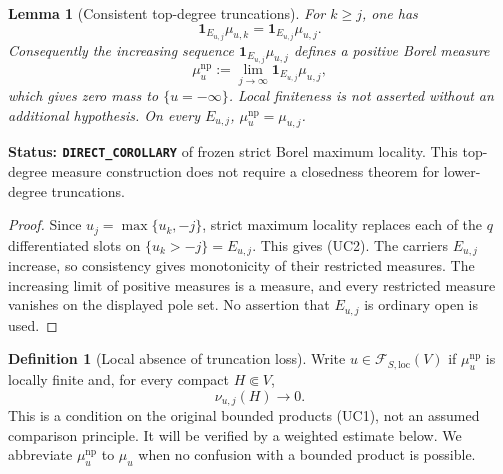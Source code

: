 \documentclass[11pt,a4paper]{article}
\numberwithin{equation}{section}
\newtheorem{lemma}[theorem]{Lemma}
\theoremstyle{definition}
\newtheorem{definition}[theorem]{Definition}
\theoremstyle{remark}
\begin{document}
\begin{lemma}[Consistent top-degree truncations]
\label{lem:r11-consistent-top-truncations}
For $k\geq j$, one has
\[
 \mathbf1_{E_{u,j}}\mu_{u,k}
       =\mathbf1_{E_{u,j}}\mu_{u,j}.
 \tag{UC2}
\]
Consequently the increasing sequence
$\mathbf1_{E_{u,j}}\mu_{u,j}$ defines a positive Borel measure
\[
                \mu_u^{\mathrm{np}}
       :=\lim_{j\to\infty}\mathbf1_{E_{u,j}}\mu_{u,j},
 \tag{UC3}
\]
which gives zero mass to $\{u=-\infty\}$. Local finiteness is
not asserted without an additional hypothesis. On every $E_{u,j}$,
$\mu_u^{\mathrm{np}}=\mu_{u,j}$.
\end{lemma}

\noindent\textbf{Status: \texttt{DIRECT\_COROLLARY}} of frozen
strict Borel maximum locality. This top-degree measure construction
does not require a closedness theorem for lower-degree truncations.

\begin{proof}
Since $u_j=\max\{u_k,-j\}$, strict maximum locality replaces
each of the $q$ differentiated slots on $\{u_k>-j\}=E_{u,j}$.
This gives (UC2). The carriers $E_{u,j}$ increase, so consistency
gives monotonicity of their restricted measures. The increasing
limit of positive measures is a measure, and every restricted
measure vanishes on the displayed pole set. No assertion that
$E_{u,j}$ is ordinary open is used.
\end{proof}

\begin{definition}[Local absence of truncation loss]
\label{def:r11-no-truncation-loss}
Write $u\in\mathcal F_{S,\mathrm{loc}}(V)$ if
$\mu_u^{\mathrm{np}}$ is locally finite and, for every compact
$H\Subset V$,
\[
                       \nu_{u,j}(H)\longrightarrow0.
 \tag{UC4}
\]
This is a condition on the original bounded products (UC1), not
an assumed comparison principle. It will be verified by a weighted
estimate below. We abbreviate $\mu_u^{\mathrm{np}}$ to $\mu_u$
when no confusion with a bounded product is possible.
\end{definition}
\end{document}
